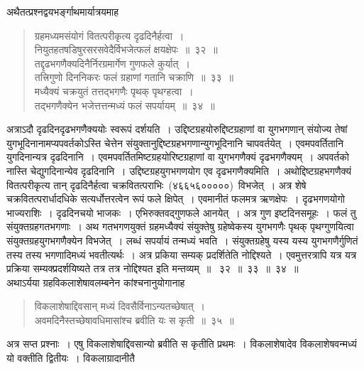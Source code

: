 \documentclass[11pt, openany]{book}
\begin{document}
\newpage
\thispagestyle{fancy}
\fancyhf{}

\indent
अथैतत्प्रश्नद्वयभर्ङ्गाथमार्यात्रयमाह\textendash

\begin{quote}
{\ks ग्रहमध्यमसंयोगं वितत्परीकृत्य दृढदिनैर्हत्वा~।\\
नियुतहतषडिषुरसरसवेदैर्विभजेत्फलं क्षयक्षेपः~॥~३२~॥\\
तद्दृढभगणैक्यदिनैर्निरग्रमार्गेण गुणफले कुर्यात्~।\\
तत्त्रिगुणो दिननिकरः फलं ग्रहाणां गतानि चक्राणि~॥~३३~॥\\
मध्यैक्यं चक्रयुतं तत्तद्भगणैः पृथक् पृथग्हत्वा~।\\
तद्भगणैक्येन भजेत्तत्तन्मध्यं फलं सपर्यायम्~॥~३४~॥}
\end{quote}

\indent
अत्राऽदौ दृढदिनदृढभगणैक्ययोः स्वरूपं दर्शयति~। उद्दिष्टग्रहयोरुद्दिष्टग्रहाणां वा युगभगणान् संयोज्य तेषां युगभूदिनानामप्यपवर्तकोऽस्ति चेत्तेन संयुक्तानुद्दिष्टग्रहभगणान्युगभूदिनानि चापवर्तयेत्~। एवमपवर्तितानि युगदिनान्यत्र
दृढदिनानि~। एवमपवर्तितमिष्टग्रहयोरिष्टग्रहाणां वा युगभगणैक्यं दृढभगणैक्यम्~। अपवर्तको नास्ति चेद्युगदिनान्येव दृढदिनानि~। उद्दिष्टग्रहयुगभगणयोग
एव दृढभगणैक्यमिति~। अथोद्दिष्टग्रहभगणैक्यं वितत्परीकृत्य तान् दृढदिनैर्हत्वा चक्रवितत्पराभिः~(४६६५६०००००)~विभजेत्~। अत्र शेषे चक्रवितत्परार्धादधिके सत्यर्धोत्तरत्वेन रूपं फले क्षिपेत्~। एवमानीतं फलमत्र ऋणक्षेपः~। दृढभगणयोगो भाज्यराशिः~। दृढदिनचयो भाजकः~। एभिरुक्तवद्गुणफले आनयेत्~। अत्र गुण इष्टदिनसमूहः~। फलं तु संयुक्तग्रहगतभगणाः~। अथ गतभगणयुक्तं ग्रहमध्यैक्यं संयुक्तेषु ग्रहेष्वेकस्य युगभगणैः पृथक् पृथग्गुणयित्वा संयुक्तग्रहयुगभगणैक्येन विभजेत्~। लब्धं सपर्यायं तन्मध्यं भवति~। संयुक्तग्रहेषु यस्य यस्य युगभगणैर्गुणितं तस्य तस्य
भगणादिमध्यं भवतीत्यर्थः~। अत्र प्रकिया सम्यक् प्रदर्शितेति नोद्दिश्यते~।
एवमुत्तरत्रापि यत्र यत्र प्रक्रिया सम्यक्प्रदर्शयिष्यते तत्र तत्र नोद्दिश्यत इति मन्तव्यम्~॥~
३२~॥~३३~॥~३४~॥\\

\indent
अथाऽर्यया ग्रहविकलाशेषावलम्बनेन कांश्चनानुयोगानाह\textendash

\begin{quote}
{\ks विकलाशेषाद्दिवसान् मध्यं दिवसैर्विनाऽन्यतच्छेषात्~।\\
अवमदिनैस्तच्छेषावधिमासांश्च ब्रवीति यः स कृती~॥~३५~॥}
\end{quote}

\indent
अत्र सप्त प्रश्नाः~। एषु विकलाशेषाद्दिवसान्यो ब्रवीति स कृतीति प्रथमः~।
विकलाशेषादेव विकलाशेषवन्मध्यं यो वक्तीति द्वितीयः~। विकलाग्रादानीतै\textendash
\end{document}

